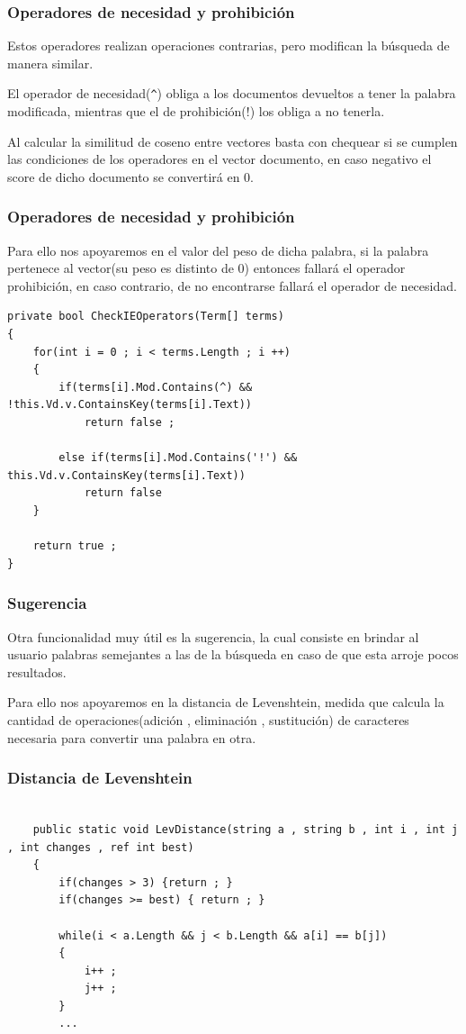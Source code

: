 \documentclass{beamer}
\begin{document}
\begin{frame}
    \frametitle{Operadores de necesidad y prohibición}
    Estos operadores realizan operaciones contrarias, pero modifican la búsqueda de manera similar.

    El operador de necesidad(\texttt{\^{}}) obliga a los documentos devueltos a tener la palabra modificada, mientras que 
    el de prohibición(!) los obliga a no tenerla.

    Al calcular la similitud de coseno entre vectores basta con chequear si se cumplen las condiciones de los operadores en 
    el vector documento, en caso negativo el score de dicho documento se convertirá en 0.


\end{frame}

\begin{frame}[fragile]
    \frametitle{Operadores de necesidad y prohibición}
    Para ello nos apoyaremos en el valor del peso de dicha palabra, si la palabra pertenece al vector(su peso es distinto de 0)
    entonces fallará el operador prohibición, en caso contrario, de no encontrarse fallará el operador de necesidad.

    \begin{lstlisting}
private bool CheckIEOperators(Term[] terms)
{
    for(int i = 0 ; i < terms.Length ; i ++)
    {
        if(terms[i].Mod.Contains(^) && !this.Vd.v.ContainsKey(terms[i].Text))
            return false ;
                
        else if(terms[i].Mod.Contains('!') && this.Vd.v.ContainsKey(terms[i].Text))
            return false 
    }
    
    return true ;
}
    \end{lstlisting}
\end{frame}

\begin{frame}
    \frametitle{Sugerencia}
    Otra funcionalidad muy útil es la sugerencia, la cual consiste en brindar al usuario palabras semejantes a las de la búsqueda en caso de que esta
    arroje pocos resultados.

    Para ello nos apoyaremos en la distancia de Levenshtein, medida que calcula la cantidad de operaciones(adición , eliminación , sustitución) de
    caracteres necesaria para convertir una palabra en otra.
\end{frame}

\begin{frame}[fragile]
    \frametitle{Distancia de Levenshtein}

    \begin{lstlisting}

    public static void LevDistance(string a , string b , int i , int j , int changes , ref int best)
    {
        if(changes > 3) {return ; }
        if(changes >= best) { return ; }

        while(i < a.Length && j < b.Length && a[i] == b[j])
        {
            i++ ;
            j++ ;
        }
        ...
        
    \end{lstlisting}

\end{frame}
\end{document}
